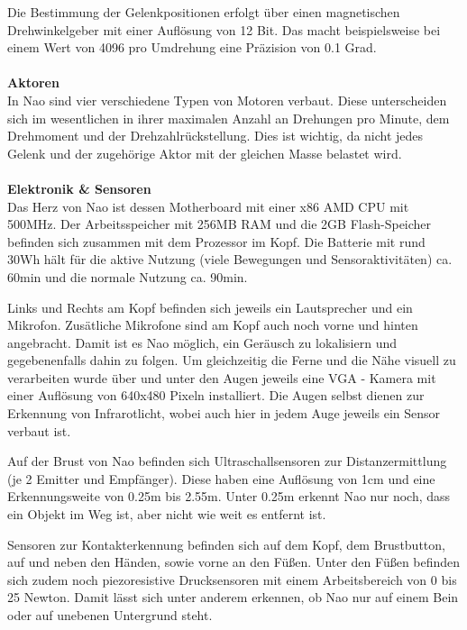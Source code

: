 Die Bestimmung der Gelenkpositionen erfolgt über einen magnetischen Drehwinkelgeber	mit einer Auflösung von 12 Bit. Das macht beispielsweise bei einem Wert von 4096 pro Umdrehung eine Präzision von 0.1 Grad.
\\
\\
\textbf{Aktoren}
\\
In Nao sind vier verschiedene Typen von Motoren verbaut. Diese unterscheiden sich im wesentlichen in ihrer maximalen Anzahl an Drehungen pro Minute, dem Drehmoment und der Drehzahlrückstellung. Dies ist wichtig, da nicht jedes Gelenk und der zugehörige Aktor mit der gleichen Masse belastet wird.
\\
\\
\textbf{Elektronik \& Sensoren}
\\
Das Herz von Nao ist dessen Motherboard mit einer x86 AMD CPU mit 500MHz. Der Arbeitsspeicher mit 256MB RAM und die 2GB Flash-Speicher befinden sich zusammen mit dem Prozessor im Kopf.  Die Batterie mit rund 30Wh hält für die aktive Nutzung (viele Bewegungen und Sensoraktivitäten) ca. 60min und die normale Nutzung ca. 90min. 

Links und Rechts am Kopf befinden sich jeweils ein Lautsprecher und ein Mikrofon. Zusätliche Mikrofone sind am Kopf auch noch vorne und hinten angebracht. Damit ist es Nao möglich, ein Geräusch zu lokalisiern und gegebenenfalls dahin zu folgen. Um gleichzeitig die Ferne und die Nähe visuell zu verarbeiten wurde über und unter den Augen jeweils eine VGA - Kamera mit einer Auflösung von 640x480 Pixeln installiert. Die Augen selbst dienen zur Erkennung von Infrarotlicht, wobei auch hier in jedem Auge jeweils ein Sensor verbaut ist.

Auf der Brust von Nao befinden sich Ultraschallsensoren zur Distanzermittlung (je 2 Emitter und Empfänger). Diese haben eine Auflösung von 1cm und eine Erkennungsweite von 0.25m bis 2.55m. Unter 0.25m erkennt Nao nur noch, dass ein Objekt im Weg ist, aber nicht wie weit es entfernt ist.

Sensoren zur Kontakterkennung befinden sich auf dem Kopf, dem Brustbutton, auf und neben den Händen, sowie vorne an den Füßen. Unter den Füßen befinden sich zudem noch piezoresistive Drucksensoren mit einem Arbeitsbereich von 0 bis 25 Newton. Damit lässt sich unter anderem erkennen, ob Nao nur auf einem Bein oder auf unebenen Untergrund steht.





